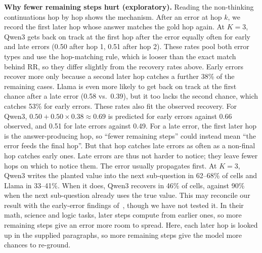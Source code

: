 \documentclass[conference]{IEEEtran}
\newcommand{\RR}{\mathrm{RR}}
\begin{document}
\textbf{Why fewer remaining steps hurt (exploratory).} Reading the non-thinking continuations hop by hop shows the mechanism. After an error at hop $k$, we record the first later hop whose answer matches the gold hop again.
At $K{=}3$, Qwen3 gets back on track at the first hop after the error equally often for early and late errors (0.50 after hop 1, 0.51 after hop 2). These rates pool both error types and use the hop-matching rule, which is looser than the exact match behind $\RR$, so they differ slightly from the recovery rates above. Early errors recover more only because a second later hop catches a further 38\% of the remaining cases.
Llama is even more likely to get back on track at the first chance after a late error (0.58 vs.\ 0.39), but it too lacks the second chance, which catches 53\% for early errors.
These rates also fit the observed recovery. For Qwen3, $0.50 + 0.50 \times 0.38 \approx 0.69$ is predicted for early errors against 0.66 observed, and 0.51 for late errors against 0.49.
For a late error, the first later hop is the answer-producing hop, so ``fewer remaining steps'' could instead mean ``the error feeds the final hop''. But that hop catches late errors as often as a non-final hop catches early ones.
Late errors are thus not harder to notice; they leave fewer hops on which to notice them.
The error usually propagates first. At $K{=}3$, Qwen3 writes the planted value into the next sub-question in 62--68\% of cells and Llama in 33--41\%. When it does, Qwen3 recovers in 46\% of cells, against 90\% when the next sub-question already uses the true value.
This may reconcile our result with the early-error findings of~\cite{vonrecum,jiamu}, though we have not tested it. In their math, science and logic tasks, later steps compute from earlier ones, so more remaining steps give an error more room to spread. Here, each later hop is looked up in the supplied paragraphs, so more remaining steps give the model more chances to re-ground.
\end{document}
